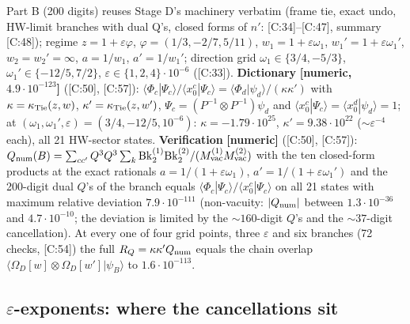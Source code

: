 \documentclass[10pt]{article}
\newcommand{\cl}[2]{\textsf{[#1:#2]}}
\newcommand{\tg}[1]{\textbf{[#1]}}
\newcommand{\Bk}{\mathrm{Bk}_2}
\newcommand{\Om}{\Omega}
\newcommand{\vac}{\mathrm{vac}}
\begin{document}
Part B (200 digits) reuses Stage D's machinery verbatim (frame tie, exact undo, HW-limit branches with dual Q's, closed forms of $n'$: \cl{C}{34}--\cl{C}{47}, summary \cl{C}{48}); regime $z=1+\varepsilon\varphi$, $\varphi=(1/3,-2/7,5/11)$, $w_1=1+\varepsilon\omega_1$, $w_1'=1+\varepsilon\omega_1'$, $w_2=w_2'=\infty$, $a=1/w_1$, $a'=1/w_1'$; direction grid $\omega_1\in\{3/4,-5/3\}$, $\omega_1'\in\{-12/5,7/2\}$, $\varepsilon\in\{1,2,4\}\cdot10^{-6}$ (\cl{C}{33}).
\textbf{Dictionary} \tg{numeric, $4.9\cdot10^{-123}$} (\cl{C}{50}, \cl{C}{57}): $\langle\Phi_c|\Psi_c\rangle/\langle x_0^c|\Psi_c\rangle=\langle\Phi_d|\psi_d\rangle/(\kappa\kappa')$ with $\kappa=\kappa_{\rm Tie}(z,w)$, $\kappa'=\kappa_{\rm Tie}(z,w')$, $\Psi_c=(P^{-1}\otimes P^{-1})\psi_d$ and $\langle x_0^c|\Psi_c\rangle=\langle x_0^d|\psi_d\rangle=1$; at $(\omega_1,\omega_1',\varepsilon)=(3/4,-12/5,10^{-6})$: $\kappa=-1.79\cdot10^{25}$, $\kappa'=9.38\cdot10^{22}$ ($\sim\varepsilon^{-4}$ each), all 21 HW-sector states.
\textbf{Verification} \tg{numeric} (\cl{C}{50}, \cl{C}{57}): $Q_{\rm num}(B)=\sum_{cc'}Q^3Q^3\sum_k\Bk^{(1)}\Bk^{(2)}/(M^{(1)}_\vac M^{(2)}_\vac)$ with the ten closed-form products at the exact rationals $a=1/(1+\varepsilon\omega_1)$, $a'=1/(1+\varepsilon\omega_1')$ and the 200-digit dual $Q$'s of the branch equals $\langle\Phi_c|\Psi_c\rangle/\langle x_0^c|\Psi_c\rangle$ on all 21 states with maximum relative deviation \textbf{$7.9\cdot10^{-111}$} (non-vacuity: $|Q_{\rm num}|$ between $1.3\cdot10^{-36}$ and $4.7\cdot10^{-10}$; the deviation is limited by the $\sim160$-digit $Q$'s and the $\sim37$-digit cancellation). At every one of four grid points, three $\varepsilon$ and six branches (72 checks, \cl{C}{54}) the full $R_Q=\kappa\kappa'Q_{\rm num}$ equals the chain overlap $\langle\Om_D[w]\otimes\Om_D[w']|\psi_B\rangle$ to $1.6\cdot10^{-113}$.

\subsection{$\varepsilon$-exponents: where the cancellations sit}\label{sec:Cexp}
\end{document}
